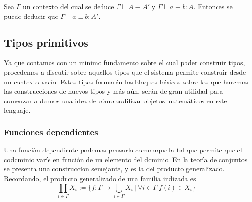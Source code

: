 \documentclass{article}
\begin{document}
        \begin{theorem}
            Sea $\Gamma$ un contexto del cual se deduce 
            $\Gamma \vdash A \equiv A'$ y $\Gamma \vdash a \equiv b : A$.
            Entonces se puede deducir que $\Gamma \vdash a \equiv b : A'$.
        \end{theorem}

    \subsection{Tipos primitivos}
        Ya que contamos con un minimo fundamento sobre el cual poder construir
        tipos, procedemos a discutir sobre aquellos tipos que el sistema
        permite construir desde un contexto vacío. Estos tipos formarán los
        bloques básicos sobre los que haremos las construcciones de nuevos
        tipos y más aún, serán de gran utilidad para comenzar a darnos una idea
        de cómo codificar objetos matemáticos en este lenguaje.
    \subsubsection{Funciones dependientes}
        Una función dependiente podemos pensarla como aquella tal que permite
        que el codominio varíe en función de un elemento del dominio. En
        la teoría de conjuntos se presenta una construcción semejante, y es la
        del producto generalizado. Recordando, el producto generalizado de una
        familia indizada es
        $$
            \prod_{i \in \Gamma} X_i := 
            \{f : \Gamma \rightarrow \bigcup\limits_{i \in \Gamma} X_i\ 
                \vert\ \forall i \in \Gamma\ f(i) \in X_i\}
        $$
\end{document}
